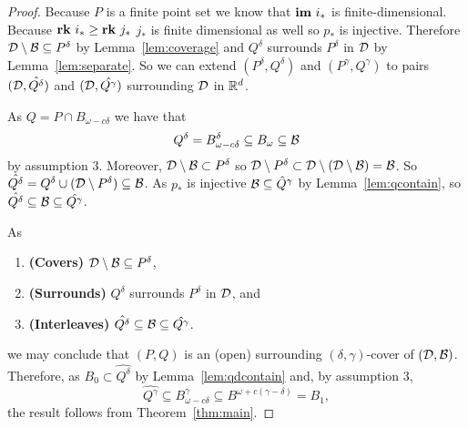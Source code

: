 \begin{proof}
  Because $P$ is a finite point set we know that $\mathbf{im}~i_*$ is finite-dimensional.
  Because $\mathbf{rk}~i_*\geq \mathbf{rk}~j_*$ $j_*$ is finite dimensional as well so $p_*$ is injective.
  Therefore ${\mathcal{D}}\setminus{\mathcal{B}}\subseteq P^\delta$ by Lemma~\ref{lem:coverage} and $Q^\delta$ surrounds $P^\delta$ in ${\mathcal{D}}$ by Lemma~\ref{lem:separate}.
  So we can extend $(P^\delta, Q^\delta)$ and $(P^\gamma, Q^\gamma)$ to pairs $({\mathcal{D}}, \hat{Q^\delta})$ and $({\mathcal{D}}, \hat{Q^\gamma})$ surrounding ${\mathcal{D}}$ in $\mathbb{R}^d$.

  As $Q = P\cap B_{\omega - c\delta}$ we have that
  \[ Q^\delta = B^\delta_{\omega - c\delta}\subseteq B_\omega \subseteq {\mathcal{B}} \]
  by assumption 3.
  Moreover, ${\mathcal{D}}\setminus{\mathcal{B}}\subset P^\delta$ so ${\mathcal{D}}\setminus P^\delta \subset {\mathcal{D}}\setminus ({\mathcal{D}}\setminus{\mathcal{B}}) = {\mathcal{B}}$.
  So $\hat{Q^\delta} = Q^\delta\cup ({\mathcal{D}}\setminus P^\delta)\subseteq {\mathcal{B}}$.
  As $p_*$ is injective ${\mathcal{B}}\subseteq \hat{Q}^\gamma$ by Lemma~\ref{lem:qcontain}, so $\hat{Q^\delta}\subseteq {\mathcal{B}}\subseteq \hat{Q^\gamma}$.

  As
  \begin{enumerate}[label=(\alph*)]
    \item\textbf{(Covers)} ${\mathcal{D}}\setminus{\mathcal{B}} \subseteq P^\delta$,
    \item\textbf{(Surrounds)} $Q^\delta$ surrounds $P^\delta$ in ${\mathcal{D}}$, and
    \item\textbf{(Interleaves)} $\hat{Q^\delta}\subseteq {\mathcal{B}}\subseteq \hat{Q^\gamma}$.
  \end{enumerate}
  we may conclude that $(P, Q)$ is an (open) surrounding $(\delta,\gamma)$-cover of $({\mathcal{D}}, {\mathcal{B}})$.
  Therefore, as $B_0\subset \hat{Q^\delta}$ by Lemma~\ref{lem:qdcontain} and, by assumption 3,
  \[ \hat{Q^\gamma}\subseteq B_{\omega-c\delta}^\gamma\subseteq B^{\omega+ c(\gamma-\delta)} = B_1, \]
  the result follows from Theorem~\ref{thm:main}.
\end{proof}

